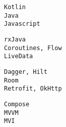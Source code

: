 \documentclass[9pt]{developercv} %
\begin{document}
\begin{minipage}[t]{0.28\textwidth}
	\vspace{-\baselineskip} %
	\texttt{Kotlin}\\
	\texttt{Java}\\
	\texttt{Javascript}\\
\end{minipage}
\hfill
\begin{minipage}[t]{0.28\textwidth}
	\vspace{-\baselineskip} %
		
	\texttt{rxJava}\\
	\texttt{Coroutines, Flow}\\
	\texttt{LiveData}\\
	
\end{minipage}
\hfill
\begin{minipage}[t]{0.28\linewidth}
	\vspace{-\baselineskip} %
		
	\texttt{Dagger, Hilt}\\
	\texttt{Room}\\
	\texttt{Retrofit, OkHttp}\\
\end{minipage}
\hfill
\begin{minipage}[t]{0.08\textwidth}
	\vspace{-\baselineskip} %
		
	\texttt{Compose}\\
	\texttt{MVVM}\\
	\texttt{MVI}\\
\end{minipage}



\end{document}
